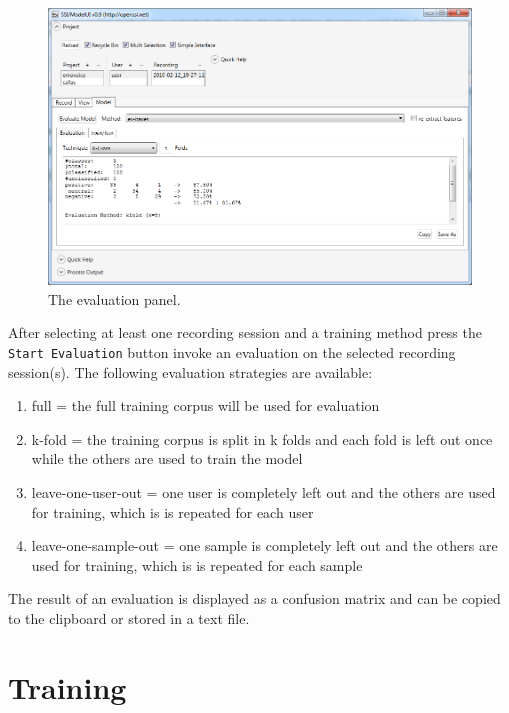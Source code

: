 \begin{figure}[h]
\begin{center}
\includegraphics[scale=0.5]{pics/train_gui_eval.png}
\end{center}
\vspace{-0.5cm}
\caption{The evaluation panel.}
\label{fig:eval_gui}
\end{figure}

After selecting at least one recording session and a training method press the \texttt{Start Evaluation} button invoke an evaluation on the selected recording session(s). The following evaluation strategies are available:

\begin{enumerate}
\item{full = the full training corpus will be used for evaluation}
\item{k-fold = the training corpus is split in k folds and each fold is left out once while the others are used to train the model}
\item{leave-one-user-out = one user is completely left out and the others are used for training, which is is repeated for each user}
\item{leave-one-sample-out = one sample is completely left out and the others are used for training, which is is repeated for each sample}
\end{enumerate}

The result of an evaluation is displayed as a confusion matrix and can be copied to the clipboard or stored in a text file.

\section{Training}\label{lab:train_overview}

